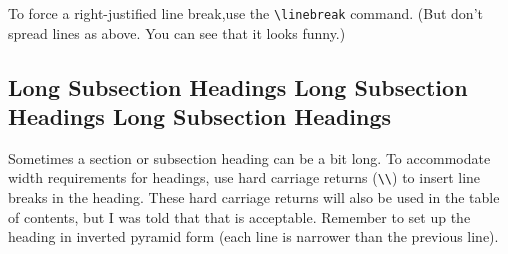 To force a right-justified line break,\linebreak use the \verb+\linebreak+ command.
(But don't spread lines as above. You can see that it looks funny.)


\subsection{Long Subsection Headings Long Subsection \\
Headings Long Subsection Headings}

Sometimes a section or subsection heading can be a bit long.
To accommodate width requirements for headings, use hard carriage returns (\verb+\\+) to insert line breaks in the heading.
These hard carriage returns will also be used in the table of contents, but I was told that that is acceptable. 
Remember to set up the heading in inverted pyramid form (each line is narrower than the previous line).


